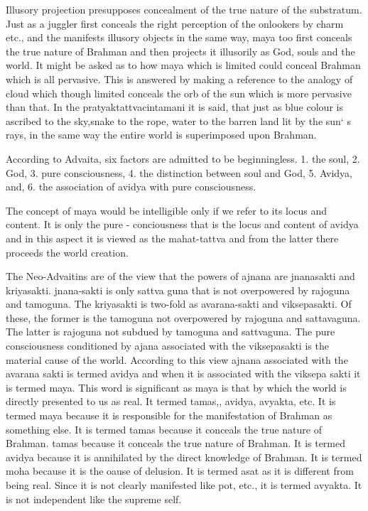 Illusory projection presupposes concealment of the true nature of the substratum. Just as a juggler first conceals the right perception of the onlookers by charm etc., and the manifests illusory objects in the same way, maya too first conceals the true nature of Brahman and then projects it illusorily as God, souls and the world. It might be asked as to how maya which is limited could conceal Brahman which is all pervasive. This is answered by making a reference to the analogy of cloud which though limited conceals the orb of the sun which is more pervasive than that. In the pratyaktattvacintamani it is said, that just as blue colour is ascribed to the sky,snake to the rope, water to the barren land lit by the sun` s rays, in the same way the entire world is superimposed upon Brahman. 

According to Advaita, six factors are admitted to be beginningless. 1. the soul, 2. God, 3. pure consciousness, 4. the distinction between soul and God, 5. Avidya, and, 6. the association of avidya with pure consciousness. 

The concept of maya would be intelligible only if we refer to its locus and content. It is only the pure - conciousness that is the locus and content of avidya and in this aspect it is viewed as the mahat-tattva and from the latter there proceeds the world creation.

The Neo-Advaitins are of the view that the powers of ajnana are jnanasakti and kriyasakti. jnana-sakti is only sattva guna that is not overpowered by rajoguna and tamoguna. The kriyasakti is two-fold as avarana-sakti and viksepasakti. Of these, the former is the tamoguna not overpowered by rajoguna and sattavaguna. The latter is rajoguna not subdued by tamoguna and sattvaguna. The pure consciousness conditioned by ajana associated with the viksepasakti is the material cause of the world. According to this view ajnana associated with the avarana sakti is termed avidya and when it is associated with the viksepa sakti it is termed maya. This word is significant as maya is that by which the world is directly presented to us as real. It termed tamas,, avidya, avyakta, etc. It is termed maya because it is responsible for the manifestation of Brahman as something else. It is termed tamas because it conceals the true nature of Brahman. tamas because it conceals the true nature of Brahman. It is termed avidya because it is annihilated by the direct knowledge of Brahman. It is termed moha because it is the oause of delusion. It is termed asat as it is different from being real. Since it is not clearly manifested like pot, etc., it is termed avyakta. It is not independent like the supreme self. 


